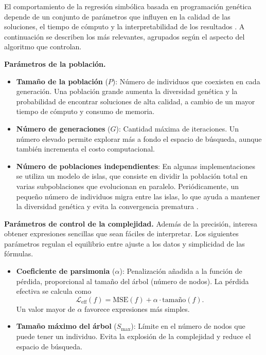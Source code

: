 \documentclass{article}
\begin{document}
El comportamiento de la regresión simbólica basada en programación
genética depende de un conjunto de parámetros que influyen en la calidad
de las soluciones, el tiempo de cómputo y la interpretabilidad de los
resultados \cite{cranmer2023pysr}. A continuación se describen los más
relevantes, agrupados según el aspecto del algoritmo que controlan.

\medskip
\noindent\textbf{Parámetros de la población.}
\begin{itemize}
    \item \textbf{Tamaño de la población} (\(P\)): Número de individuos
          que coexisten en cada generación. Una población grande aumenta
          la diversidad genética y la probabilidad de encontrar
          soluciones de alta calidad, a cambio de un mayor tiempo de
          cómputo y consumo de memoria.

    \item \textbf{Número de generaciones} (\(G\)): Cantidad máxima de
          iteraciones. Un número elevado permite explorar más a fondo el
          espacio de búsqueda, aunque también incrementa el costo
          computacional.

    \item \textbf{Número de poblaciones independientes}: En algunas
          implementaciones se utiliza un modelo de islas, que consiste
          en dividir la población total en varias subpoblaciones que
          evolucionan en paralelo. Periódicamente, un pequeño número de
          individuos migra entre las islas, lo que ayuda a mantener la
          diversidad genética y evita la convergencia prematura
          \cite{whitley1990island}.
\end{itemize}

\medskip
\noindent\textbf{Parámetros de control de la complejidad.}
Además de la precisión, interesa obtener expresiones sencillas que sean
fáciles de interpretar. Los siguientes parámetros regulan el equilibrio
entre ajuste a los datos y simplicidad de las fórmulas.

\begin{itemize}
    \item \textbf{Coeficiente de parsimonia} (\(\alpha\)): Penalización
          añadida a la función de pérdida, proporcional al tamaño del
          árbol (número de nodos). La pérdida efectiva se calcula como
          \[
          \mathcal{L}_{\text{eff}}(f) = \text{MSE}(f) + \alpha \cdot
          \text{tamaño}(f).
          \]
          Un valor mayor de \(\alpha\) favorece expresiones más simples.

    \item \textbf{Tamaño máximo del árbol} (\(S_{\max}\)): Límite en el
          número de nodos que puede tener un individuo. Evita la
          explosión de la complejidad y reduce el espacio de búsqueda.
\end{itemize}
\end{document}
